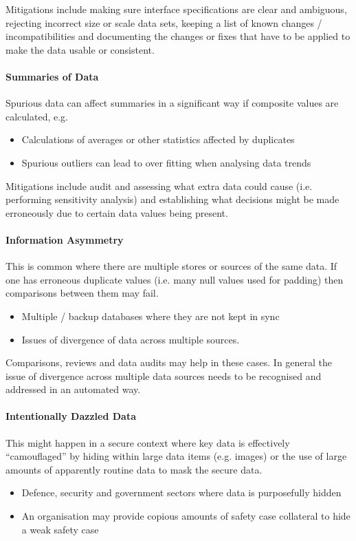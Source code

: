 Mitigations include making sure interface specifications are clear and ambiguous, rejecting incorrect size or scale data sets, keeping a list of known changes / incompatibilities and documenting the changes or fixes that have to be applied to make the data usable or consistent.

\paragraph{Summaries of Data}
Spurious data can affect summaries in a significant way if composite values are calculated, e.g.
\begin{itemize}
    \item Calculations of averages or other statistics affected by duplicates
    \item Spurious outliers can lead to over fitting when analysing data trends
\end{itemize}

Mitigations include audit and assessing what extra data could cause (i.e. performing sensitivity analysis) and establishing what decisions might be made erroneously due to certain data values being present.	

\paragraph{Information Asymmetry}
This is common where there are multiple stores or sources of the same data. If one has erroneous duplicate values (i.e. many null values used for padding) then comparisons between them may fail.
\begin{itemize}
    \item Multiple / backup \glspl{database} where they are not kept in sync
    \item Issues of divergence of data across multiple sources.
\end{itemize}

Comparisons, reviews and data audits may help in these cases. In general the issue of divergence across multiple data sources needs to be recognised and addressed in an automated way.

\paragraph{Intentionally Dazzled Data}
This might happen in a secure context where key data is effectively ``camouflaged'' by hiding within large data items (e.g. images) or the use of large amounts of apparently routine data to mask the secure data.
\begin{itemize}
    \item Defence, security and government sectors where data is purposefully hidden 
    \item An organisation may provide copious amounts of safety case collateral to hide a weak safety case
\end{itemize}
